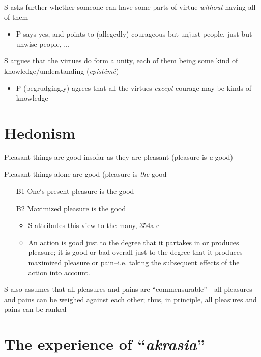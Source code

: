 \documentclass[oneside]{article}
\begin{document}
\begin{itemize}
\noindent S asks further whether someone can have some parts of virtue \emph{without} having all of them
\begin{itemize}
\item{P says yes, and points to (allegedly) courageous but unjust people, just but unwise people, ...}\end{itemize}

\noindent S argues that the virtues do form a unity, each of them being some kind of knowledge/understanding (\emph{epist\^{e}m\^{e}})

\begin{itemize}\item{P (begrudgingly) agrees that all the virtues \emph{except} courage may be kinds of knowledge}\end{itemize}

\section*{Hedonism}

\noindent [A] Pleasant things are good insofar as they are pleasant (pleasure is \emph{a} good)
\vspace*{2mm}

\noindent [B] Pleasant things alone are good (pleasure is \emph{the} good

\begin{itemize}
\item[B1]  One`s present pleasure is the good
\item[B2]  Maximized pleasure is the good
\begin{itemize}
\item S attributes this view to the many, 354a-c
\item An action is good just to the degree that it partakes in or produces pleasure; it is good or bad overall just to the degree that it produces maximized pleasure or pain--i.e. taking the subsequent effects of the action into account.
\end{itemize}
\end{itemize}

\vspace*{2mm}

\noindent S also assumes that all pleasures and pains are ``commensurable''---all pleasures and pains can be weighed against each other; thus, in principle, all pleasures and pains can be ranked

\section*{The experience of ``\emph{akrasia}''}


\end{itemize}
\end{document}
